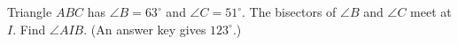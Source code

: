 Triangle $ABC$ has $\angle B=63^\circ$ and $\angle C=51^\circ$. The bisectors of $\angle B$ and $\angle C$ meet at $I$. Find $\angle AIB$. (An answer key gives $123^\circ$.)
